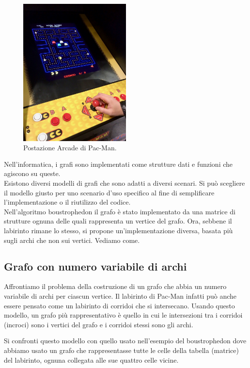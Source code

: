 \documentclass[8pt]{book}
\begin{document}
\begin{figure}
  \centering
  \includegraphics[width=0.5\textwidth]{img/imgConLicenza/postazione/postazione.jpg}
  \caption{Postazione Arcade di Pac-Man.}
  \label{postazione}
\end{figure}

Nell'informatica, i grafi sono implementati come strutture dati e funzioni che agiscono su queste.\\
Esistono diversi modelli di grafi che sono adatti a diversi scenari. Si può scegliere il modello giusto per uno scenario d'uso specifico al fine di semplificare l'implementazione o il riutilizzo del codice.\\
Nell'algoritmo boustrophedon il grafo è stato implementato da una matrice di strutture ognuna delle quali rappresenta un vertice del grafo. Ora, sebbene il labirinto rimane lo stesso, si propone un'implementazione diversa, basata più sugli archi che non sui vertici. Vediamo come.

\subsection{Grafo con numero variabile di archi}
Affrontiamo il problema della costruzione di un grafo che abbia un numero variabile di archi per ciascun vertice. Il labirinto di Pac-Man infatti può anche essere pensato come un labirinto di corridoi che si intersecano. Usando questo modello, un grafo più rappresentativo è quello in cui le intersezioni tra i corridoi (incroci) sono i vertici del grafo e i corridoi stessi sono gli archi.

Si confronti questo modello con quello usato nell'esempio del boustrophedon dove abbiamo usato un grafo che rappresentasse tutte le celle della tabella (matrice) del labirinto, ognuna collegata alle sue quattro celle vicine.
\end{document}
